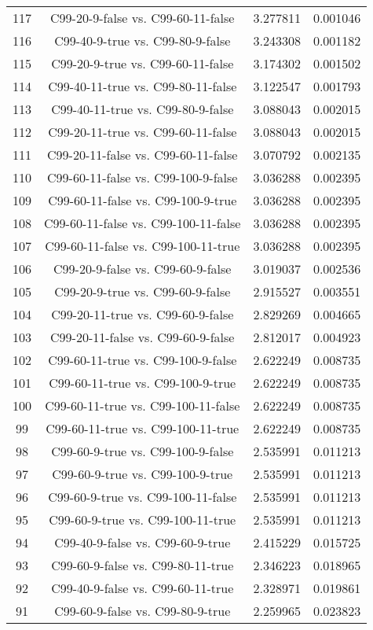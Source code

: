 \documentclass[a4paper,10pt]{article}
\begin{document}
\begin{landscape}
\begin{table}[!htp]
\begin{tabular}{cccc}
117&C99-20-9-false vs. C99-60-11-false&3.277811&0.001046\\
116&C99-40-9-true vs. C99-80-9-false&3.243308&0.001182\\
115&C99-20-9-true vs. C99-60-11-false&3.174302&0.001502\\
114&C99-40-11-true vs. C99-80-11-false&3.122547&0.001793\\
113&C99-40-11-true vs. C99-80-9-false&3.088043&0.002015\\
112&C99-20-11-true vs. C99-60-11-false&3.088043&0.002015\\
111&C99-20-11-false vs. C99-60-11-false&3.070792&0.002135\\
110&C99-60-11-false vs. C99-100-9-false&3.036288&0.002395\\
109&C99-60-11-false vs. C99-100-9-true&3.036288&0.002395\\
108&C99-60-11-false vs. C99-100-11-false&3.036288&0.002395\\
107&C99-60-11-false vs. C99-100-11-true&3.036288&0.002395\\
106&C99-20-9-false vs. C99-60-9-false&3.019037&0.002536\\
105&C99-20-9-true vs. C99-60-9-false&2.915527&0.003551\\
104&C99-20-11-true vs. C99-60-9-false&2.829269&0.004665\\
103&C99-20-11-false vs. C99-60-9-false&2.812017&0.004923\\
102&C99-60-11-true vs. C99-100-9-false&2.622249&0.008735\\
101&C99-60-11-true vs. C99-100-9-true&2.622249&0.008735\\
100&C99-60-11-true vs. C99-100-11-false&2.622249&0.008735\\
99&C99-60-11-true vs. C99-100-11-true&2.622249&0.008735\\
98&C99-60-9-true vs. C99-100-9-false&2.535991&0.011213\\
97&C99-60-9-true vs. C99-100-9-true&2.535991&0.011213\\
96&C99-60-9-true vs. C99-100-11-false&2.535991&0.011213\\
95&C99-60-9-true vs. C99-100-11-true&2.535991&0.011213\\
94&C99-40-9-false vs. C99-60-9-true&2.415229&0.015725\\
93&C99-60-9-false vs. C99-80-11-true&2.346223&0.018965\\
92&C99-40-9-false vs. C99-60-11-true&2.328971&0.019861\\
91&C99-60-9-false vs. C99-80-9-true&2.259965&0.023823\\

\end{tabular}
\end{table}
\end{landscape}
\end{document}
